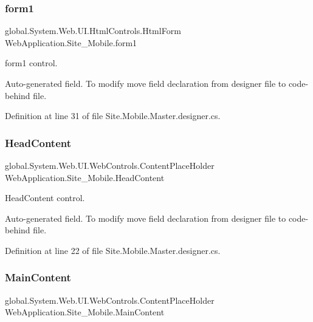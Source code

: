 \subsubsection{\texorpdfstring{form1}{form1}}
{\footnotesize\ttfamily global.\+System.\+Web.\+U\+I.\+Html\+Controls.\+Html\+Form Web\+Application.\+Site\+\_\+\+Mobile.\+form1\hspace{0.3cm}{\ttfamily [protected]}}



form1 control. 

Auto-\/generated field. To modify move field declaration from designer file to code-\/behind file. 

Definition at line 31 of file Site.\+Mobile.\+Master.\+designer.\+cs.

\mbox{\label{classWebApplication_1_1Site__Mobile_a5b517c9a41ad5652f6e46e6f0130d6be}} 
\subsubsection{\texorpdfstring{HeadContent}{HeadContent}}
{\footnotesize\ttfamily global.\+System.\+Web.\+U\+I.\+Web\+Controls.\+Content\+Place\+Holder Web\+Application.\+Site\+\_\+\+Mobile.\+Head\+Content\hspace{0.3cm}{\ttfamily [protected]}}



Head\+Content control. 

Auto-\/generated field. To modify move field declaration from designer file to code-\/behind file. 

Definition at line 22 of file Site.\+Mobile.\+Master.\+designer.\+cs.

\mbox{\label{classWebApplication_1_1Site__Mobile_a202ba18830e6285a2bb9d00ef105401c}} 
\subsubsection{\texorpdfstring{MainContent}{MainContent}}
{\footnotesize\ttfamily global.\+System.\+Web.\+U\+I.\+Web\+Controls.\+Content\+Place\+Holder Web\+Application.\+Site\+\_\+\+Mobile.\+Main\+Content\hspace{0.3cm}{\ttfamily [protected]}}



